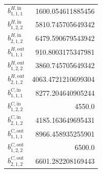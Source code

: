 \documentclass{article}%
\begin{document}
\begin{multicols*}{3}
\begin{supertabular}{lr}
	$b_{1,1,1}^{H,\text{in}}$ & 1600.054611885456 \\%
	$b_{1,2,2}^{H,\text{in}}$ & 5810.745705649342 \\%
	$b_{2,1,2}^{H,\text{in}}$ & 6479.590679543942 \\%
	$b_{1,1,1}^{H,\text{out}}$ & 910.8003175347981 \\%
	$b_{1,2,2}^{H,\text{out}}$ & 3860.745705649342 \\%
	$b_{2,1,2}^{H,\text{out}}$ & 4063.4721210699304 \\%
	$b_{1,1,1}^{C,\text{in}}$ & 8277.204640905244 \\%
	$b_{1,2,2}^{C,\text{in}}$ & 4550.0 \\%
	$b_{2,1,2}^{C,\text{in}}$ & 4185.163649695431 \\%
	$b_{1,1,1}^{C,\text{out}}$ & 8966.458935255901 \\%
	$b_{1,2,2}^{C,\text{out}}$ & 6500.0 \\%
	$b_{2,1,2}^{C,\text{out}}$ & 6601.282208169443 \\%
\end{supertabular}%
\end{multicols*}%
\clearpage%
\end{document}
